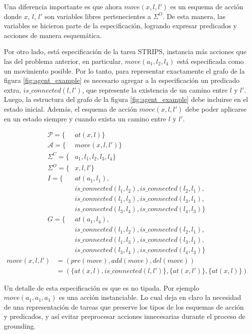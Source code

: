 Una diferencia importante es que ahora $move(x, l, l')$ es un esquema de acción donde $x$, $l$, $l'$ son variables libres pertenecientes a $\Sigma^{O}$. De esta manera, las variables se hicieron parte de la especificación, logrando expresar predicados y acciones de manera esquemática.

Por otro lado, está especificación de la tarea STRIPS, instancia más acciones que las del problema anterior, en particular, $move(a_1, l_2, l_4)$ está especificada como un movimiento posible. Por lo tanto, para representar exactamente el grafo de la figura \ref{fig:agent_example} es necesario agregar a la especificación un predicado extra, $is\_connected(l, l')$, que represente la existencia de un camino entre $l$ y $l'$. Luego, la estructura del grafo de la figura \ref{fig:agent_example} debe incluirse en el estado inicial. Además, el esquema de acción $move(x, l, l')$ debe poder aplicarse en un estado siempre y cuando exista un camino entre $l$ y $l'$.

\begin{align*}
    \mathcal{P} = \{&at(x, l)\} \\
    \mathcal{A} = \{&move(x, l, l')\} \\
    \Sigma^{C} = \{&a_1, l_1, l_2, l_3, l_4\} \\
    \Sigma^{O} = \{&x, l, l'\} \\
    I = \{& at(a_1, l_1), \\
          & is\_connected(l_1, l_2), is\_connected(l_2, l_1), \\
          & is\_connected(l_1, l_3), is\_connected(l_3, l_1), \\
          & is\_connected(l_3, l_4), is\_connected(l_4, l_3)\} \\
    G = \{& at(a_1, l_4), \\
          & is\_connected(l_1, l_2), is\_connected(l_2, l_1), \\
          & is\_connected(l_1, l_3), is\_connected(l_3, l_1), \\
          & is\_connected(l_3, l_4), is\_connected(l_4, l_3)\}
\end{align*}
\begin{align*}
    move(x, l, l') &= (pre(move), add(move), del(move)) \\
                   &= (\{at(x, l), is\_connected(l, l')\}, \{at(x, l')\},\{at(x, l)\})
\end{align*}

Un detalle de esta especificación es que es no tipada. Por ejemplo $move(a_1, a_1, a_1)$ es una acción instanciable. Lo cual deja en claro la necesidad de una representación de tareas que preserve los tipos de los esquemas de acción y predicados, y así evitar preprocesar acciones innecesarias durante el proceso de grounding.

